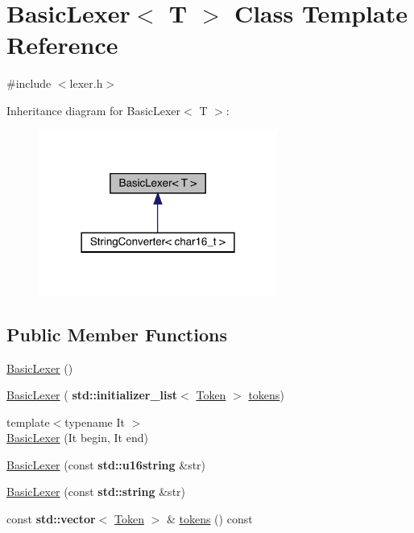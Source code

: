 \hypertarget{class_basic_lexer}{}\section{Basic\+Lexer$<$ T $>$ Class Template Reference}
\label{class_basic_lexer}


{\ttfamily \#include $<$lexer.\+h$>$}



Inheritance diagram for Basic\+Lexer$<$ T $>$\+:\nopagebreak
\begin{figure}[H]
\begin{center}
\leavevmode
\includegraphics[width=222pt]{class_basic_lexer__inherit__graph}
\end{center}
\end{figure}
\subsection*{Public Member Functions}
\begin{DoxyCompactItemize}
\item 
\hyperlink{class_basic_lexer_abc267aed0ef7227486b932f13b2917f0}{Basic\+Lexer} ()
\item 
\hyperlink{class_basic_lexer_a58d2038fb47025d4e32c20750e713b43}{Basic\+Lexer} (\textbf{ std\+::initializer\+\_\+list}$<$ \hyperlink{class_token}{Token} $>$ \hyperlink{class_basic_lexer_a0572d78653674f48c4e1bdb6eeb31980}{tokens})
\item 
{\footnotesize template$<$typename It $>$ }\\\hyperlink{class_basic_lexer_a7b8cb3ec8ba1ef5567bd280800f891f8}{Basic\+Lexer} (It begin, It end)
\item 
\hyperlink{class_basic_lexer_aee8242905dd2c3541322900bdd05a7b7}{Basic\+Lexer} (const \textbf{ std\+::u16string} \&str)
\item 
\hyperlink{class_basic_lexer_ab486a96453887dc7f9efd08c518ae0b0}{Basic\+Lexer} (const \textbf{ std\+::string} \&str)
\item 
const \textbf{ std\+::vector}$<$ \hyperlink{class_token}{Token} $>$ \& \hyperlink{class_basic_lexer_a0572d78653674f48c4e1bdb6eeb31980}{tokens} () const
\end{DoxyCompactItemize}


